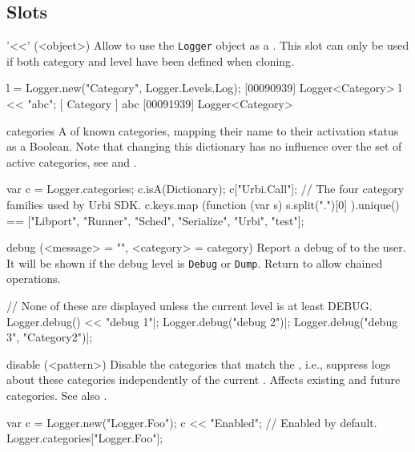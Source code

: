 \subsection{Slots}

\begin{urbiscriptapi}
\item['<<'](<object>)%
  Allow to use the \lstinline|Logger| object as a . This
  slot can only be used if both category and level have been defined when
  cloning.

\begin{urbiunchecked}
l = Logger.new("Category", Logger.Levels.Log);
[00090939] Logger<Category>
l << "abc";
[       Category        ] abc
[00091939] Logger<Category>
\end{urbiunchecked}


\item[categories]%
  A  of known categories, mapping their name to their
  activation status as a Boolean.  Note that changing this dictionary has no
  influence over the set of active categories, see  and
  .
\begin{urbiassert}[firstnumber=1]
var c = Logger.categories;
c.isA(Dictionary);
c["Urbi.Call"];
// The four category families used by Urbi SDK.
c.keys.map (function (var s) { s.split(".")[0] }).unique()
  == ["Libport", "Runner", "Sched", "Serialize", "Urbi", "test"];
\end{urbiassert}


\item[debug](<message> = "", <category> = category)%
  Report a debug  of  to the user. It will be
  shown if the debug level is \lstinline|Debug| or \lstinline|Dump|. Return
  \this to allow chained operations.
\begin{urbiunchecked}
// None of these are displayed unless the current level is at least DEBUG.
Logger.debug() << "debug 1"|;
Logger.debug("debug 2")|;
Logger.debug("debug 3", "Category2")|;
\end{urbiunchecked}


\item[disable](<pattern>)%
  Disable the categories that match the , i.e., suppress logs
  about these categories independently of the current .
  Affects existing and future categories.  See also .
\begin{urbiassert}
var c = Logger.new("Logger.Foo");
c << "Enabled";
// Enabled by default.
Logger.categories["Logger.Foo"];


\end{urbiassert}
\end{urbiscriptapi}

